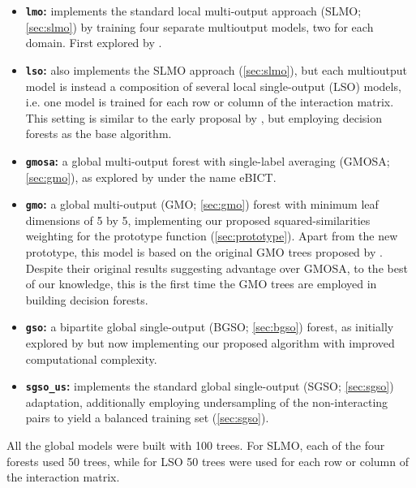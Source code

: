 
\begin{itemize}
    \item \textbf{\texttt{lmo}:} implements the standard local multi-output approach (SLMO; \autoref{sec:slmo}) by training four separate multioutput models, two for each domain. First explored by \textcite{schrynemackers2015classifying}.
    \item \textbf{\texttt{lso}:} also implements the SLMO approach (\autoref{sec:slmo}), but each multioutput model is instead a composition of several local single-output (LSO) models, i.e. one model is trained for each row or column of the interaction matrix. This setting is similar to the early proposal by \textcite{bleakley2009supervised}, but employing decision forests as the base algorithm.
    \item \textbf{\texttt{gmosa}:} a global multi-output forest with single-label averaging (GMOSA; \autoref{sec:gmo}), as explored by \textcite{pliakos2019network} under the name eBICT.
    \item \textbf{\texttt{gmo}:} a global multi-output (GMO; \autoref{sec:gmo}) forest with minimum leaf dimensions of 5 by 5, implementing our proposed squared-similarities weighting for the prototype function (\autoref{sec:prototype}). Apart from the new prototype, this model is based on the original GMO trees proposed by \textcite{pliakos2018global}. Despite their original results suggesting advantage over GMOSA, to the best of our knowledge, this is the first time the GMO trees are employed in building decision forests.  %
    \item \textbf{\texttt{gso}:} a bipartite global single-output (BGSO; \autoref{sec:bgso}) forest, as initially explored by \textcite{schrynemackers2015classifying} but now implementing our proposed algorithm with improved computational complexity.
    \item \textbf{\texttt{sgso\_us}:} implements the standard global single-output (SGSO; \autoref{sec:sgso}) adaptation, additionally employing undersampling of the non-interacting pairs to yield a balanced training set (\autoref{sec:sgso}).  %
\end{itemize}

All the global models were built with 100 trees. For SLMO, each of the four forests used 50 trees, while for LSO 50 trees were used for each row or column of the interaction matrix.

